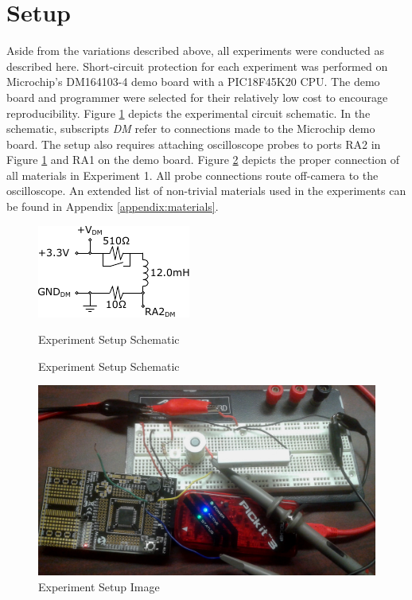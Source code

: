 \documentclass[11pt,oneside]{report}
\begin{document}
    \section{Setup}
    Aside from the variations described above, all experiments were conducted as described here. Short-circuit protection for each experiment was performed on Microchip's DM164103-4 demo board with a PIC18F45K20 CPU. The demo board and programmer were selected for their relatively low cost to encourage reproducibility. 
    Figure \ref{fig:ExperimentSetup} depicts the experimental circuit schematic. In the schematic, subscripts \textit{DM} refer to connections made to the Microchip demo board. The setup also requires attaching oscilloscope probes to ports RA2 in Figure \ref{fig:ExperimentSetup} and RA1 on the demo board. Figure \ref{fig:Experiment1Setup} depicts the proper connection of all materials in Experiment 1. All probe connections route off-camera to the oscilloscope. An extended list of non-trivial materials used in the experiments can be found in Appendix \ref{appendix:materials}.
    \begin{figure}
        \centering
        \includegraphics[width=0.45\linewidth]{img/Experiment_Setup.pdf}
        \caption{Experiment Setup Schematic} Experiment Setup Schematic
        \label{fig:ExperimentSetup}
    \end{figure}
    
    \begin{figure}
    	\centering
        \includegraphics[width=0.75\linewidth]{img/SCD_5_9mH_EXP_SETUP.jpg}
        \caption{Experiment Setup Image}
        \label{fig:Experiment1Setup}
    \end{figure}
\end{document}
